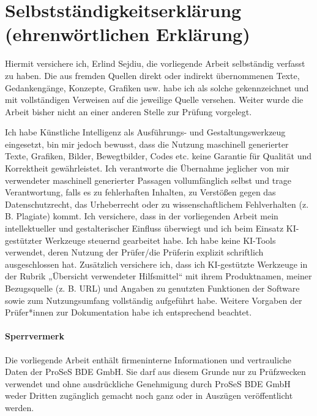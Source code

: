 \section*{Selbstständigkeitserklärung (ehrenwörtlichen Erklärung)}

\vspace{1cm}

Hiermit versichere ich, Erlind Sejdiu, die vorliegende Arbeit selbständig verfasst zu 
haben. Die aus fremden Quellen direkt oder indirekt übernommenen Texte, Gedankengänge, Konzepte, Grafiken usw. habe ich als solche gekennzeichnet und mit vollständigen Verweisen auf die jeweilige Quelle versehen. Weiter wurde die Arbeit bisher nicht an einer anderen Stelle zur Prüfung vorgelegt.

Ich habe Künstliche Intelligenz als Ausführungs- und Gestaltungswerkzeug eingesetzt, bin mir
jedoch bewusst, dass die Nutzung maschinell generierter Texte, Grafiken, Bilder, Bewegtbilder,
Codes etc. keine Garantie für Qualität und Korrektheit gewährleistet. Ich verantworte die Übernahme jeglicher von mir verwendeter maschinell generierter Passagen vollumfänglich selbst und trage Verantwortung, falls es zu fehlerhaften Inhalten, zu Verstößen gegen das Datenschutzrecht, das Urheberrecht oder zu wissenschaftlichem Fehlverhalten (z. B. Plagiate) kommt. Ich versichere, dass in der vorliegenden Arbeit mein intellektueller und gestalterischer Einfluss überwiegt und ich beim Einsatz KI-gestützter Werkzeuge steuernd gearbeitet habe. Ich habe keine KI-Tools verwendet, deren Nutzung der Prüfer/die Prüferin explizit schriftlich ausgeschlossen hat. Zusätzlich versichere ich, dass ich KI-gestützte Werkzeuge in der Rubrik „Übersicht verwendeter Hilfsmittel“ mit ihrem Produktnamen, meiner Bezugsquelle (z. B. URL) und Angaben zu genutzten Funktionen der Software sowie zum Nutzungsumfang vollständig aufgeführt habe. Weitere Vorgaben der Prüfer*innen zur Dokumentation habe ich entsprechend beachtet.

\paragraph{Sperrvermerk}
Die vorliegende Arbeit enthält firmeninterne Informationen und vertrauliche Daten der ProSeS BDE GmbH. Sie darf aus diesem Grunde nur zu Prüfzwecken verwendet und ohne ausdrückliche Genehmigung durch ProSeS BDE GmbH weder Dritten zugänglich gemacht noch ganz oder in Auszügen veröffentlicht werden.


